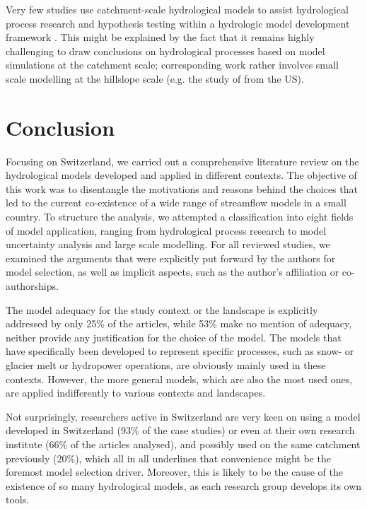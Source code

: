 \documentclass[10pt,a4paper]{article}
\begin{document}
Very few studies use catchment-scale hydrological models to assist hydrological process research and hypothesis testing within a hydrologic model development framework \citep{clarkOpinion2016}. This might be explained by the fact that it remains highly challenging to draw conclusions on hydrological processes based on model simulations at the catchment scale; corresponding work rather involves small scale modelling at the hillslope scale (e.g. the study of \citealt{Heuvel2018} from the US).  


\section{Conclusion}
\label{sec:conclusion}

Focusing on Switzerland, we carried out a comprehensive literature review on the hydrological models developed and applied in different contexts. The objective of this work was to disentangle the motivations and reasons behind the choices that led to the current co-existence of a wide range of streamflow models in a small country. To structure the analysis, we attempted a classification into eight fields of model application, ranging from hydrological process research to model uncertainty analysis and large scale modelling. For all reviewed studies, we examined the arguments that were explicitly put forward by the authors for model selection, as well as implicit aspects, such as the author's affiliation or co-authorships. 

The model adequacy for the study context or the landscape is explicitly addressed by only 25\% of the articles, while 53\% make no mention of adequacy, neither provide any justification for the choice of the model. The models that have specifically been developed to represent specific processes, such as snow- or glacier melt or hydropower operations, are obviously mainly used in these contexts. However, the more general models, which are also the most used ones, are applied indifferently to various contexts and landscapes.

Not surprisingly, researchers active in Switzerland are very keen on using a model developed in Switzerland (93\% of the case studies) or even at their own research institute (66\% of the articles analysed), and possibly used on the same catchment previously (20\%), which all in all underlines that convenience might be the foremost model selection driver. Moreover, this is likely to be the cause of the existence of so many hydrological models, as each research group develops its own tools.
\end{document}
